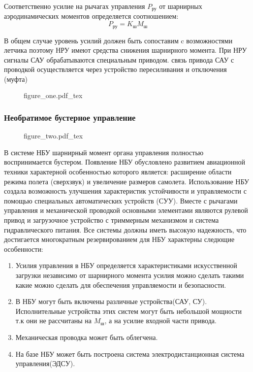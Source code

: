 \documentclass{article}
\begin{document}
Соответственно усилие на рычагах управления $P_\text{ру}$ от шарнирных
аэродинамических моментов определяется соотношением:
\[
    P_\text{ру} = K_\text{ш} M_\text{ш}
\]

В общем случае уровень усилий должен быть сопоставим c возможностями летчика
поэтому НРУ имеют средства снижения шарнирного момента. При НРУ сигналы САУ
обрабатываются специальным приводом. связь привода САУ с проводкой
осуществляется через устройство пересиливания и отключения (муфта)


\begin{figure}[ht]
    {figure_one.pdf_tex}
\end{figure}

\subsubsection{Необратимое бустерное управление}

\begin{figure}[ht]
    {figure_two.pdf_tex}
\end{figure}

В системе НБУ шарнирный момент органа управления полностью воспринимается
бустером. Появление НБУ обусловлено развитием авиационной техники характерной
особенностью которого является: расширение области режима полета (сверхзвук) и
увеличение размеров самолета. Использование НБУ создала возможность улучшения
характеристик устойчивости и управляемости с помощью специальных автоматических
устройств (СУУ). Вместе с рычагами управления и механической проводкой
основными элементами являются рулевой привод и загрузочное устройство с
триммерным механизмом и система гидравлического питания. Все системы должны
иметь высокую надежность, что достигается многократным резервированием для НБУ
характерны следющие особенности:
\begin{enumerate}
    \item Усилия управления в НБУ определяется характеристиками искусственной
        загрузки независимо от шарнирного момента усилия можно сделать такими
        какие можно сделать для обеспечения управляемости и безопасности.
    \item В НБУ могут быть включены различные устройства(САУ, СУ).
        Исполнительные устройства этих систем могут быть небольшой мощности т.к
        они не рассчитаны на $M_\text{ш}$, а на усилие входной части привода.
    \item Механическая проводка может быть облегчена.
    \item На базе НБУ может быть построена система электродистанционная система
        управления(ЭДСУ).
\end{enumerate}
\end{document}
